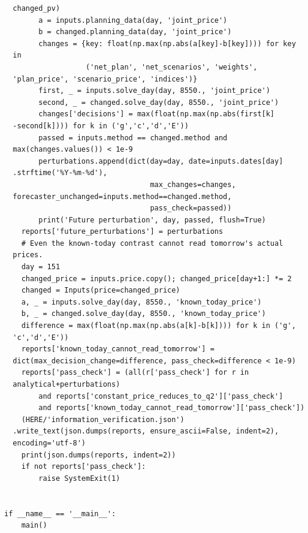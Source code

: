 \begin{verbatim}
  changed_pv)
        a = inputs.planning_data(day, 'joint_price')
        b = changed.planning_data(day, 'joint_price')
        changes = {key: float(np.max(np.abs(a[key]-b[key]))) for key
  in
                   ('net_plan', 'net_scenarios', 'weights',
  'plan_price', 'scenario_price', 'indices')}
        first, _ = inputs.solve_day(day, 8550., 'joint_price')
        second, _ = changed.solve_day(day, 8550., 'joint_price')
        changes['decisions'] = max(float(np.max(np.abs(first[k]
  -second[k]))) for k in ('g','c','d','E'))
        passed = inputs.method == changed.method and
  max(changes.values()) < 1e-9
        perturbations.append(dict(day=day, date=inputs.dates[day]
  .strftime('%Y-%m-%d'),
                                  max_changes=changes,
  forecaster_unchanged=inputs.method==changed.method,
                                  pass_check=passed))
        print('Future perturbation', day, passed, flush=True)
    reports['future_perturbations'] = perturbations
    # Even the known-today contrast cannot read tomorrow's actual
  prices.
    day = 151
    changed_price = inputs.price.copy(); changed_price[day+1:] *= 2
    changed = Inputs(price=changed_price)
    a, _ = inputs.solve_day(day, 8550., 'known_today_price')
    b, _ = changed.solve_day(day, 8550., 'known_today_price')
    difference = max(float(np.max(np.abs(a[k]-b[k]))) for k in ('g',
  'c','d','E'))
    reports['known_today_cannot_read_tomorrow'] =
  dict(max_decision_change=difference, pass_check=difference < 1e-9)
    reports['pass_check'] = (all(r['pass_check'] for r in
  analytical+perturbations)
        and reports['constant_price_reduces_to_q2']['pass_check']
        and reports['known_today_cannot_read_tomorrow']['pass_check'])
    (HERE/'information_verification.json')
  .write_text(json.dumps(reports, ensure_ascii=False, indent=2),
  encoding='utf-8')
    print(json.dumps(reports, indent=2))
    if not reports['pass_check']:
        raise SystemExit(1)


if __name__ == '__main__':
    main()
\end{verbatim}

